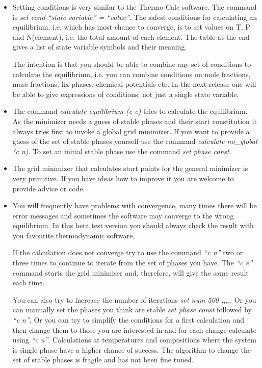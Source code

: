 \documentclass[12pt]{article}
\begin{document}
\begin{itemize}
\item Setting conditions is very similar to the Thermo-Calc software.
The command is {\em set cond ``state variable'' = ``value''}.  The
safest conditions for calculating an equilibrium, i.e. which has most
chance to converge, is to set values on T, P and N(element), i.e. the
total amount of each element.  The table at the end gives a list of
state variable symbols and their meaning.

The intention is that you should be able to combine any set of
conditions to calculate the equilibrium, i.e. you can combine
conditions on mole fractions, mass fractions, fix phases, chemical
potentials etc.  In the next release one will be able to give
expressions of conditions, not just a single state variable.

\item The command {\em calculate equilibrium (c e)} tries to calculate
the equilibrium.  As the minimizer needs a guess of stable phases and
their start constitution it always tries first to invoke a global grid
minimizer.  If you want to provide a guess of the set of stable phases
yourself use the command {\em calculate no\_global (c n)}.  To set an
initial stable phase use the command {\em set phase const}.

\item The grid minimizer that calculates start points for the general
minimizer is very primitive.  If you have ideas how to improve it you
are welcome to provide advice or code.

\item You will frequently have problems with convergence, many times
there will be error messages and sometimes the software may converge
to the wrong equilibrium.  In this beta test version you should always
check the result with you favourite thermodynamic software.

If the calculation does not converge try to use the command {\em ``c
n''} two or three times to continue to iterate from the set of phases
you have.  The {\em ``c e''} command starts the grid minimiser and,
therefore, will give the same result each time.  

You can also try to increase the number of iterations {\em set num 500
,,,,}.  Or you can manually set the phases you think are stable {\em
set phase const} followed by {\em ``c n''}.  Or you can try to
simplify the conditions for a first calculation and then change them
to those you are interested in and for each change calculate using
{\em ``c n''}.  Calculations at temperatures and compositions where
the system is single phase have a higher chance of success.  The
algorithm to change the set of stable phases is fragile and has not
been fine tuned.


\end{itemize}
\end{document}

